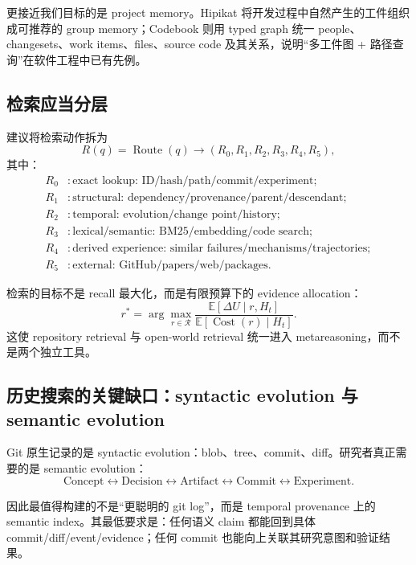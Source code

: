 \documentclass[11pt,a4paper]{ctexart}
\newcommand{\E}{\mathbb{E}}
\newcommand{\Cost}{\operatorname{Cost}}
\begin{document}
更接近我们目标的是 project memory。Hipikat 将开发过程中自然产生的工件组织成可推荐的 group memory\parencite{cubranic2005hipikat}；Codebook 则用 typed graph 统一 people、changesets、work items、files、source code 及其关系，说明“多工件图 + 路径查询”在软件工程中已有先例\parencite{begel2010codebook}。

\subsection{检索应当分层}

建议将检索动作拆为
\begin{equation}
 R(q)=\operatorname{Route}(q)\to (R_0,R_1,R_2,R_3,R_4,R_5),
\end{equation}
其中：
\begin{align*}
R_0 &: \text{exact lookup: ID/hash/path/commit/experiment};\\
R_1 &: \text{structural: dependency/provenance/parent/descendant};\\
R_2 &: \text{temporal: evolution/change point/history};\\
R_3 &: \text{lexical/semantic: BM25/embedding/code search};\\
R_4 &: \text{derived experience: similar failures/mechanisms/trajectories};\\
R_5 &: \text{external: GitHub/papers/web/packages}.
\end{align*}

检索的目标不是 recall 最大化，而是有限预算下的 evidence allocation：
\begin{equation}
 r^*=\arg\max_{r\in\mathcal R}\frac{\E[\Delta U\mid r,H_t]}{\E[\Cost(r)\mid H_t]}.
\end{equation}
这使 repository retrieval 与 open-world retrieval 统一进入 metareasoning，而不是两个独立工具。

\subsection{历史搜索的关键缺口：syntactic evolution 与 semantic evolution}

Git 原生记录的是 syntactic evolution：blob、tree、commit、diff。研究者真正需要的是 semantic evolution：
\begin{equation}
 \text{Concept}\leftrightarrow\text{Decision}\leftrightarrow\text{Artifact}\leftrightarrow\text{Commit}\leftrightarrow\text{Experiment}.
\end{equation}

因此最值得构建的不是“更聪明的 git log”，而是 temporal provenance 上的 semantic index。其最低要求是：任何语义 claim 都能回到具体 commit/diff/event/evidence；任何 commit 也能向上关联其研究意图和验证结果。
\end{document}
